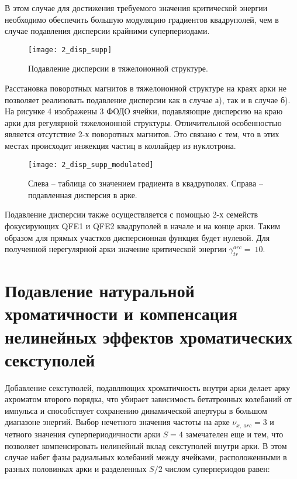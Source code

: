 \par В этом случае для достижения требуемого значения критической энергии необходимо обеспечить большую модуляцию градиентов квадруполей, чем в случае подавления дисперсии крайними суперпериодами.
	
\begin{figure} [h!]
   \center
   \texttt{[image: 2\_disp\_supp]}
   \caption{Подавление дисперсии в тяжелоионной структуре.}
   \label{fig:2_disp_supp}
\end{figure}

\par Расстановка поворотных магнитов в тяжелоионной структуре на краях арки не позволяет реализовать подавление дисперсии как в случае а), так и в случае б). На рисунке 4 изображены 3 ФОДО ячейки, подавляющие дисперсию на краю арки для регулярной тяжелоионной структуры. Отличительной особенностью является отсутствие 2-х поворотных магнитов. Это связано с тем, что в этих местах происходит инжекция частиц в коллайдер из нуклотрона.

\begin{figure}
   \center
   \texttt{[image: 2\_disp\_supp\_modulated]}
   \caption{Слева – таблица со значением градиента в квадруполях. Справа – подавленная дисперсия в арке.}
   \label{fig:2_disp_supp_modulated}
\end{figure}
	
\par Подавление дисперсии также осуществляется с помощью 2-х семейств фокусирующих QFE1 и QFE2 квадруполей в начале и на конце арки.  Таким образом для прямых участков дисперсионная функция будет нулевой. Для полученной нерегулярной арки значение критической энергии $\gamma_{tr}^{arc}=\ 10$.

	\section{Подавление натуральной хроматичности и компенсация нелинейных эффектов хроматических секступолей}\label{sec:transition_variation/methods/chromaticity}

\par Добавление секступолей, подавляющих хроматичность внутри арки делает арку ахроматом второго порядка, что убирает зависимость бетатронных колебаний от импульса и способствует сохранению динамической апертуры в большом диапазоне энергий. Выбор нечетного значения частоты на арке $\nu_{x,\ arc}=3$ и четного значения суперпериодичности арки $S=4$ замечателен еще и тем, что позволяет компенсировать нелинейный вклад секступолей внутри арки. В этом случае набег фазы радиальных колебаний между ячейками, расположенными в разных половинках арки и разделенных $S/2$ числом суперпериодов равен:

